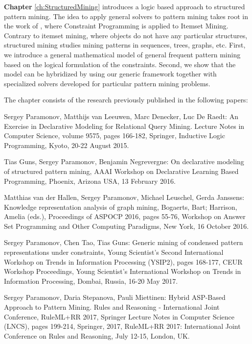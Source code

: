 \textbf{Chapter} \ref{ch:StructuredMining} introduces a logic
based approach to structured pattern mining. The idea to apply general
solvers to pattern mining takes root in the work of
\textcite{declrativeapproach}, where Constraint Programming is applied to
Itemset Mining. Contrary to itemset mining, where objects do not have
any particular structures, structured mining studies mining patterns
in sequences, trees, graphs, etc. First, we introduce a general
mathematical model of general frequent pattern mining based on the logical formulation of
the constraints. Second, we show that the model can be hybridized by
using our generic framework together with specialized solvers
developed for particular pattern mining problems.

The chapter consists of the research previously published in the following papers:
\begin{addmargin}[2em]{2em}
Sergey Paramonov, Matthijs van Leeuwen, Marc Denecker, Luc De Raedt:
An Exercise in Declarative Modeling for Relational Query Mining.
Lecture Notes in Computer Science, volume 9575, pages 166-182,
    Springer, Inductive Logic Programming, Kyoto, 20-22 August 2015.

Tias Guns, Sergey Paramonov, Benjamin Negrevergne: On declarative
    modeling of structured pattern mining, AAAI Workshop on
    Declarative Learning Based Programming, Phoenix, Arizona USA, 13
    February 2016.

Matthias van der Hallen, Sergey Paramonov, Michael Leuschel, Gerda
    Janssens: Knowledge representation analysis of graph mining,
    Bogaerts, Bart; Harrison, Amelia (eds.), Proceedings of ASPOCP
    2016, pages 55-76, Workshop on Answer Set Programming and Other
    Computing Paradigms, New York, 16 October 2016.

Sergey Paramonov, Chen Tao, Tias Guns: Generic mining of condensed
    pattern representations under constraints, Young Scientist's
    Second International Workshop on Trends in Information Processing
    (YSIP2), pages 168-177, CEUR Workshop Proceedings, Young
    Scientist's International Workshop on Trends in Information
    Processing, Dombai, Russia, 16-20 May 2017.

Sergey Paramonov, Daria Stepanova, Pauli Miettinen:
Hybrid ASP-Based Approach to Pattern Mining.  
Rules and Reasoning - International Joint Conference, RuleML+RR 2017,
    Springer Lecture Notes in Computer Science (LNCS), pages 199-214,
    Springer, 2017, RuleML+RR 2017: International Joint Conference on
    Rules and Reasoning, July 12-15, London, UK.
\end{addmargin}

